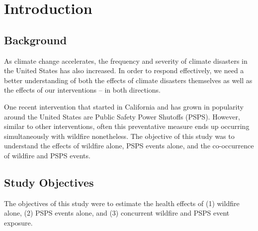 \documentclass[../main.tex]{subfiles}
\begin{document}
\section{Introduction}


\subsection{Background}

As climate change accelerates, the frequency and severity of climate disasters in the United States has also increased.\citep{us_epa_climate_2022, noaa_climate_2021} In order to respond effectively, we need a better understanding of both the effects of climate disasters themselves as well as the effects of our interventions -- in both directions.

One recent intervention that started in California and has grown in popularity around the United States are Public Safety Power Shutoffs (PSPS).\citep{pse_public_nodate} However, similar to other interventions, often this preventative measure ends up occurring simultaneously with wildfire \PM nonetheless. The objective of this study was to understand the effects of wildfire \PM alone, PSPS events alone, and the co-occurrence of wildfire \PM and PSPS events.

\subsection{Study Objectives}

The objectives of this study were to estimate the health effects of (1) wildfire \PM alone, (2) PSPS events alone, and (3) concurrent wildfire \PM and PSPS event exposure.

%
% 

\clearpage
\end{document}
